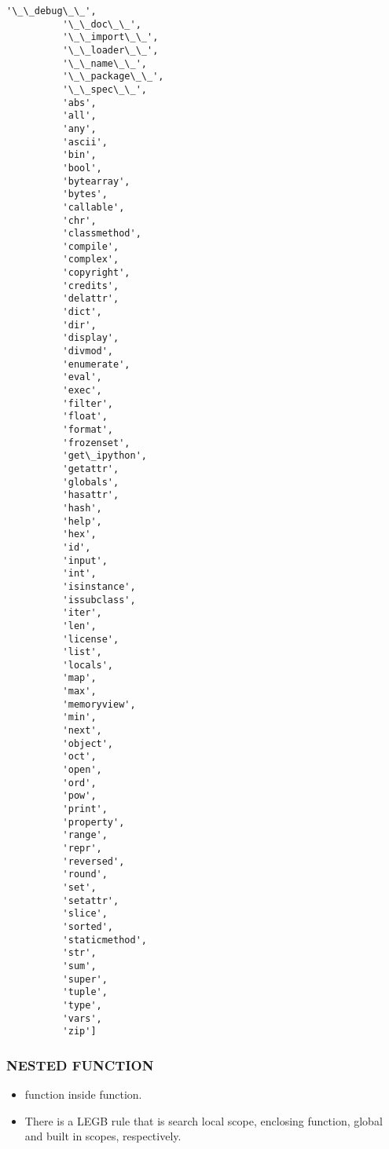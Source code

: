 \documentclass[11pt]{article}
\providecommand{\tightlist}{%
      \setlength{\itemsep}{0pt}\setlength{\parskip}{0pt}}
\begin{document}
\begin{Verbatim}[commandchars=\\\{\}]
          '\_\_debug\_\_',
          '\_\_doc\_\_',
          '\_\_import\_\_',
          '\_\_loader\_\_',
          '\_\_name\_\_',
          '\_\_package\_\_',
          '\_\_spec\_\_',
          'abs',
          'all',
          'any',
          'ascii',
          'bin',
          'bool',
          'bytearray',
          'bytes',
          'callable',
          'chr',
          'classmethod',
          'compile',
          'complex',
          'copyright',
          'credits',
          'delattr',
          'dict',
          'dir',
          'display',
          'divmod',
          'enumerate',
          'eval',
          'exec',
          'filter',
          'float',
          'format',
          'frozenset',
          'get\_ipython',
          'getattr',
          'globals',
          'hasattr',
          'hash',
          'help',
          'hex',
          'id',
          'input',
          'int',
          'isinstance',
          'issubclass',
          'iter',
          'len',
          'license',
          'list',
          'locals',
          'map',
          'max',
          'memoryview',
          'min',
          'next',
          'object',
          'oct',
          'open',
          'ord',
          'pow',
          'print',
          'property',
          'range',
          'repr',
          'reversed',
          'round',
          'set',
          'setattr',
          'slice',
          'sorted',
          'staticmethod',
          'str',
          'sum',
          'super',
          'tuple',
          'type',
          'vars',
          'zip']
\end{Verbatim}
            
    \hypertarget{nested-function}{%
\subsubsection{NESTED FUNCTION}\label{nested-function}}

\begin{itemize}
\tightlist
\item
  function inside function.
\item
  There is a LEGB rule that is search local scope, enclosing function,
  global and built in scopes, respectively.
\end{itemize}
\end{document}
